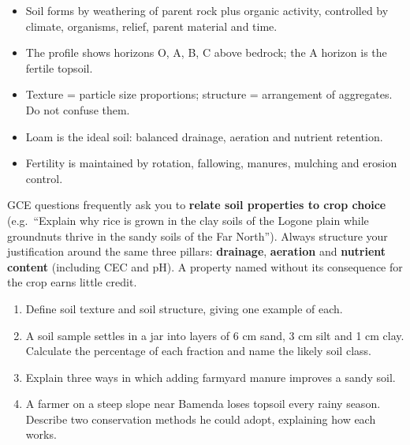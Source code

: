 \documentclass[11pt]{article}
\begin{document}
\begin{aretenir}
\begin{itemize}
\item Soil forms by weathering of parent rock plus organic activity, controlled by climate, organisms, relief, parent material and time.
\item The profile shows horizons O, A, B, C above bedrock; the A horizon is the fertile topsoil.
\item Texture = particle size proportions; structure = arrangement of aggregates. Do not confuse them.
\item Loam is the ideal soil: balanced drainage, aeration and nutrient retention.
\item Fertility is maintained by rotation, fallowing, manures, mulching and erosion control.
\end{itemize}
\end{aretenir}

\begin{exemplebox}
GCE questions frequently ask you to \textbf{relate soil properties to crop choice} (e.g.\ ``Explain why rice is grown in the clay soils of the Logone plain while groundnuts thrive in the sandy soils of the Far North''). Always structure your justification around the same three pillars: \textbf{drainage}, \textbf{aeration} and \textbf{nutrient content} (including CEC and pH). A property named without its consequence for the crop earns little credit.
\end{exemplebox}

\begin{exercice}
\begin{enumerate}
\item Define soil texture and soil structure, giving one example of each.
\item A soil sample settles in a jar into layers of 6 cm sand, 3 cm silt and 1 cm clay. Calculate the percentage of each fraction and name the likely soil class.
\item Explain three ways in which adding farmyard manure improves a sandy soil.
\item A farmer on a steep slope near Bamenda loses topsoil every rainy season. Describe two conservation methods he could adopt, explaining how each works.
\end{enumerate}
\end{exercice}
\end{document}
